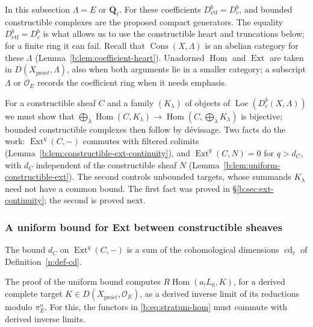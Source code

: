 \documentclass[11pt,a4paper]{article}
\numberwithin{equation}{section}
\theoremstyle{definition}
\theoremstyle{remark}
\newcommand{\D}{D}
\newcommand{\Dbc}{D^b_c}
\newcommand{\RHom}{R\!\operatorname{Hom}}
\newcommand{\Loc}{\operatorname{Loc}}
\newcommand{\Qbar}{\overline{\mathbf Q}_\ell}
\newcommand{\proet}{\mathrm{pro}\acute{e}t}
\newcommand{\Hom}{\operatorname{Hom}}
\newcommand{\Ext}{\operatorname{Ext}}
\newcommand{\Cons}{\operatorname{Cons}}
\newcommand{\Dctf}{D^b_{\mathrm{ctf}}}
\begin{document}
In this subsection $\Lambda=E$ or $\Qbar$. For these coefficients
$\Dctf=\Dbc$, and bounded constructible complexes are the proposed
compact generators. The equality $\Dctf=\Dbc$ is what allows us to use
the constructible heart and truncations below; for a finite ring it can
fail. Recall that $\Cons(X,\Lambda)$ is an abelian category for these
$\Lambda$ (Lemma~\ref{b:lem:coefficient-heart}). Unadorned
$\Hom$ and $\Ext$ are taken in $\D(X_{\proet},\Lambda)$, also when both
arguments lie in a smaller category; a subscript $\Lambda$ or
$\mathcal O_E$ records the coefficient ring when it needs emphasis.

For a constructible sheaf $C$ and a family $(K_\lambda)$ of objects of
$\Loc(\Dbc(X,\Lambda))$ we must show that
$\bigoplus_\lambda\Hom(C,K_\lambda)\to\Hom(C,\bigoplus_\lambda K_\lambda)$
is bijective; bounded constructible complexes then follow by d\'evissage.
Two facts do the work: $\Ext^q(C,-)$ commutes with filtered colimits
(Lemma~\ref{b:lem:constructible-ext-continuity}), and $\Ext^q(C,N)=0$ for
$q>d_C$, with $d_C$ independent of the constructible sheaf $N$
(Lemma~\ref{b:lem:uniform-constructible-ext}). The second controls
unbounded targets, whose summands $K_\lambda$ need not have a common
bound. The first fact was proved in \S\ref{b:sec:ext-continuity}; the
second is proved next.

\subsubsection{A uniform bound for Ext between constructible sheaves}

The bound $d_C$ on $\Ext^q(C,-)$ is a sum of the cohomological
dimensions $\operatorname{cd}_\ell$ of Definition~\ref{n:def-cd}.



The proof of the uniform bound computes $\RHom(a_!L_0,K)$, for a derived
complete target $K\in\D(X_{\proet},\mathcal O_E)$, as a derived inverse limit of its reductions modulo
$\pi_E^n$. For this, the functors in \eqref{b:eq:stratum-hom} must
commute with derived inverse limits.
\end{document}
